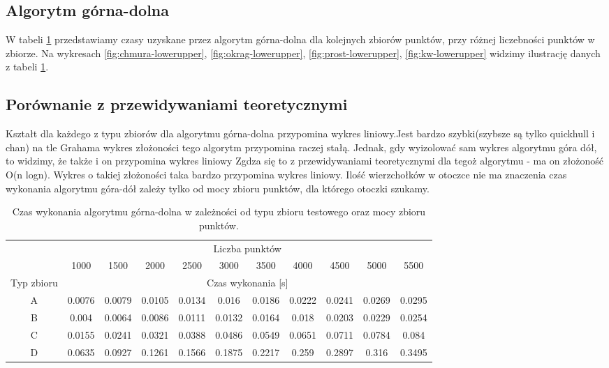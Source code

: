 \documentclass[11pt]{article}
\theoremstyle{remark} \newtheorem{definition}{def.}
\theoremstyle{definition} \newtheorem{twierdzenie}{tw.}
\begin{document}
\subsection{Algorytm górna-dolna}

W tabeli \ref{tab:lowerupper} przedstawiamy czasy uzyskane przez algorytm górna-dolna dla kolejnych zbiorów punktów, przy różnej liczebności punktów w zbiorze. Na wykresach \ref{fig:chmura-lowerupper}, 
\ref{fig:okrag-lowerupper}, \ref{fig:prost-lowerupper}, \ref{fig:kw-lowerupper} widzimy ilustrację danych z tabeli \ref{tab:lowerupper}.

\subsection{Porównanie z przewidywaniami teoretycznymi} Kształt dla każdego z typu zbiorów dla algorytmu górna-dolna przypomina wykres liniowy.Jest bardzo szybki(szybsze są tylko quickhull i chan)
na tle Grahama wykres złożoności tego algorytm przypomina raczej stałą. Jednak, gdy wyizolować sam wykres algorytmu góra dół, to widzimy, że także i on przypomina wykres liniowy
Zgdza się to z przewidywaniami teoretycznymi dla tegoż algorytmu - ma on złożoność O(n logn). 
Wykres o takiej złożoności taka bardzo przypomina wykres liniowy. 
Ilość wierzchołków w otoczce nie ma znaczenia czas wykonania algorytmu góra-dół zależy tylko od mocy zbioru punktów, dla którego otoczki szukamy.


\begin{table}[]
\centering
\caption{Czas wykonania algorytmu górna-dolna w zależności od typu zbioru testowego oraz mocy zbioru punktów.}
\label{tab:lowerupper}
\begin{tabular}{c|c|c|c|c|c|c|c|c|c|c|}
\cline{2-11}
\multicolumn{1}{l|}{} & \multicolumn{10}{c|}{Liczba punktów} \\ \cline{2-11} 
\multicolumn{1}{l|}{} & 1000 & 1500 & 2000 & 2500 & 3000 & 3500 & 4000 & 4500 & 5000 & 5500 \\ \hline
\multicolumn{1}{|c|}{Typ zbioru} & \multicolumn{10}{c|}{Czas wykonania [s]} \\ \hline
\multicolumn{1}{|c|}{A} & 0.0076 & 0.0079 & 0.0105 & 0.0134 & 0.016 & 0.0186 & 0.0222 & 0.0241 & 0.0269 & 0.0295 \\ \hline
\multicolumn{1}{|c|}{B} & 0.004 & 0.0064 & 0.0086 & 0.0111 & 0.0132 & 0.0164 & 0.018 & 0.0203 & 0.0229 & 0.0254 \\ \hline
\multicolumn{1}{|c|}{C} & 0.0155 & 0.0241 & 0.0321 & 0.0388 & 0.0486 & 0.0549 & 0.0651 & 0.0711 & 0.0784 & 0.084 \\ \hline
\multicolumn{1}{|c|}{D} & 0.0635 & 0.0927 & 0.1261 & 0.1566 & 0.1875 & 0.2217 & 0.259 & 0.2897 & 0.316 & 0.3495 \\ \hline
\end{tabular}
\end{table}
\end{document}
